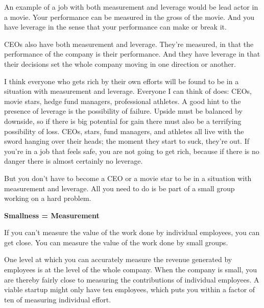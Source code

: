 An
                    example of a job with both measurement and leverage would be
                    lead actor in a movie. Your performance can be measured in
                    the gross of the movie. And you have leverage in the sense
                    that your performance can make or break it.

CEOs
                    also have both measurement and leverage. They're measured,
                    in that the performance of the company is their performance.
                    And they have leverage in that their decisions set the whole
                    company moving in one direction or another.

I
                    think everyone who gets rich by their own efforts will be
                    found to be in a situation with measurement and leverage.
                    Everyone I can think of does: CEOs, movie stars, hedge fund
                    managers, professional athletes. A good hint to the presence
                    of leverage is the possibility of failure. Upside must be
                    balanced by downside, so if there is big potential for gain
                    there must also be a terrifying possibility of loss. CEOs,
                    stars, fund managers, and athletes all live with the sword
                    hanging over their heads; the moment they start to suck,
                    they're out. If you're in a job that feels safe, you are not
                    going to get rich, because if there is no danger there is
                    almost certainly no leverage.

But you don't have
                    to become a CEO or a movie star to be in a situation with
                    measurement and leverage. All you need to do is be part of a
                    small group working on a hard problem.

\textbf{Smallness = Measurement}

If you can't measure the value of the work done
                    by individual employees, you can get close. You can measure
                    the value of the work done by small groups.

One
                    level at which you can accurately measure the revenue
                    generated by employees is at the level of the whole company.
                    When the company is small, you are thereby fairly close to
                    measuring the contributions of individual employees. A
                    viable startup might only have ten employees, which puts you
                    within a factor of ten of measuring individual effort.

